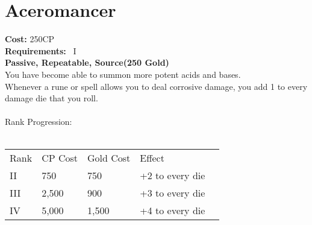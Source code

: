 \section{Aceromancer}\label{perk:aceromancer}
\textbf{Cost:} 250CP\\
\textbf{Requirements:}~ I\\
\textbf{Passive, Repeatable, Source(250 Gold)}\\
You have become able to summon more potent acids and bases.\\
Whenever a rune or spell allows you to deal corrosive damage, you add 1 to every damage die that you roll.\\
\\
Rank Progression:\\
\\
\begin{tabular}{l | l | l | l | l}
    Rank & CP Cost & Gold Cost &  Effect\\
    II & 750 & 750 & +2 to every die\\
    III & 2,500 & 900 & +3 to every die\\
    IV & 5,000 & 1,500 & +4 to every die\\
\end{tabular}